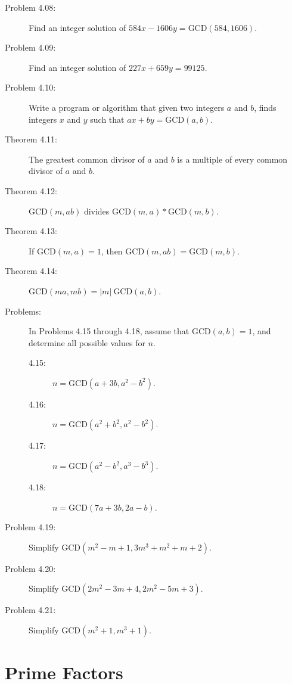 \documentclass{article}
\begin{document}
\begin{description}
  \item[Problem 4.08:] Find an integer solution of $584x-1606y = \text{GCD}(584, 1606)$.

  \item[Problem 4.09:] Find an integer solution of $227x+659y = 99125$.

  \item[Problem 4.10:] Write a program or algorithm that given two integers $a$ and $b$, finds integers $x$ and $y$ such that $ax+by = \text{GCD}(a, b)$.

  \item[Theorem 4.11:] The greatest common divisor of $a$ and $b$ is a multiple of every common divisor of $a$ and $b$.

  \item[Theorem 4.12:] $\text{GCD}(m,ab)$ divides $\text{GCD}(m,a) * \text{GCD}(m,b)$.

  \item[Theorem 4.13:] If $\text{GCD}(m,a) = 1$, then $\text{GCD}(m,ab) = \text{GCD}(m,b)$.

  \item[Theorem 4.14:] $\text{GCD}(ma,mb) = \vert m \vert \ \text{GCD}(a,b)$.

  \item[Problems:] In Problems 4.15 through 4.18, assume that $\text{GCD}(a,b) = 1$, and determine all possible values for $n$.
    \begin{description}
      \item[4.15:] $n = \text{GCD}(a+3b, a^2-b^2)$.
      \item[4.16:] $n = \text{GCD}(a^2+b^2, a^2-b^2)$.
      \item[4.17:] $n = \text{GCD}(a^2-b^2,a^3-b^3)$.
      \item[4.18:] $n = \text{GCD}(7a+3b, 2a-b)$.
    \end{description}

  \item[Problem 4.19:] Simplify $\text{GCD}(m^2-m+1, 3m^3+m^2+m+2)$.

  \item[Problem 4.20:] Simplify $\text{GCD}(2m^2-3m+4, 2m^2-5m+3)$.

  \item[Problem 4.21:] Simplify $\text{GCD}(m^2+1, m^3+1)$.

\end{description}


\section{Prime Factors}
\end{document}
